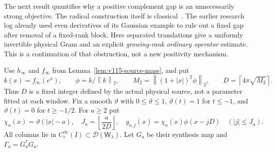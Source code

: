\documentclass[11pt]{article}
\theoremstyle{remark}
\newcommand{\norm}[1]{\left\lVert #1\right\rVert}
\begin{document}
The next result quantifies why a positive complement gap is an
unnecessarily strong objective.  The radical construction itself is
classical~\cite[Section 3]{ConnesConsani2023}.  The earlier research
log already used even derivatives of its Gaussian example to rule out
a fixed gap after removal of a fixed-rank block.  Here separated
translations give a uniformly invertible physical Gram and an explicit
\emph{growing-rank ordinary operator} estimate.  This is a continuation
of that obstruction, not a new positivity mechanism.

Use $h_\infty$ and $f_\infty$ from
Lemma~\ref{lem:v115-source-mass}, and put
\[
 k(x)=f_\infty(e^x),\qquad \phi=k/\norm k_2,\qquad
 M_2=\norm{(1+|x|)^2\phi}_2,\qquad
 D=\left\lceil4\pi\sqrt{M_2}\right\rceil.
\]
Thus $D$ is a fixed integer defined by the actual physical source,
not a parameter fitted at each window.  Fix a smooth $\vartheta$ with
$0\le\vartheta\le1$, $\vartheta(t)=1$ for $t\le-1$, and
$\vartheta(t)=0$ for $t\ge-1/2$.  For $a\ge2$ put
\[
 \chi_a(x)=\vartheta(|x|-a),\quad
 J_a=\left\lfloor\frac{a}{2D}\right\rfloor,\quad
 g_{a,j}(x)=\chi_a(x)\phi(x-jD)\quad(|j|\le J_a).
\]
All columns lie in $C_c^\infty(I)\subset\mathcal D(\mathsf W_\lambda)$.
Let $G_a$ be their synthesis map and $\Gamma_a=G_a^*G_a$.
\end{document}

